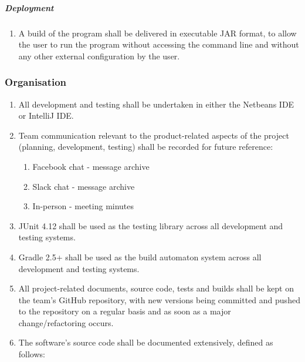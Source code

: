 \documentclass[11pt]{article}
\providecommand{\tightlist}{%
  \setlength{\itemsep}{0pt}\setlength{\parskip}{0pt}}
\begin{document}
\subparagraph{Deployment}\label{deployment}

\begin{enumerate}
\def\labelenumi{\arabic{enumi}.}
\tightlist
\item
  A build of the program shall be delivered in executable JAR format, to
  allow the user to run the program without accessing the command line
  and without any other external configuration by the user.
\end{enumerate}

\subsubsection{Organisation}\label{organisation}

\begin{enumerate}
\def\labelenumi{\arabic{enumi}.}
\tightlist
\item
  All development and testing shall be undertaken in either the Netbeans
  IDE or IntelliJ IDE.
\item
  Team communication relevant to the product-related aspects of the
  project (planning, development, testing) shall be recorded for future
  reference:

  \begin{enumerate}
  \def\labelenumii{\arabic{enumii}.}
  \tightlist
  \item
    Facebook chat - message archive
  \item
    Slack chat - message archive
  \item
    In-person - meeting minutes
  \end{enumerate}
\item
  JUnit 4.12 shall be used as the testing library across all development
  and testing systems.
\item
  Gradle 2.5+ shall be used as the build automaton system across all
  development and testing systems.
\item
  All project-related documents, source code, tests and builds shall be
  kept on the team's GitHub repository, with new versions being
  committed and pushed to the repository on a regular basis and as soon
  as a major change/refactoring occurs.
\item
  The software's source code shall be documented extensively, defined as
  follows:


\end{enumerate}
\end{document}

